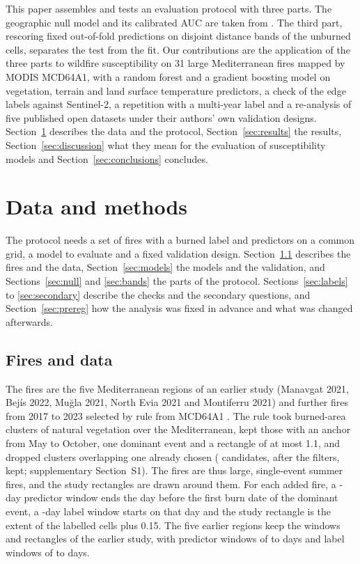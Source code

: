 \documentclass[preprint,12pt,authoryear]{elsarticle}
\begin{document}
This paper assembles and tests an evaluation protocol with three parts. The geographic null model and its calibrated AUC are taken from \citet{Hijmans2012}. The third part, rescoring fixed out-of-fold predictions on disjoint distance bands of the unburned cells, separates the test from the fit. Our contributions are the application of the three parts to wildfire susceptibility on 31 large Mediterranean fires mapped by MODIS MCD64A1, with a random forest and a gradient boosting model on vegetation, terrain and land surface temperature predictors, a check of the edge labels against Sentinel-2, a repetition with a multi-year label and a re-analysis of five published open datasets under their authors' own validation designs. Section~\ref{sec:methods} describes the data and the protocol, Section~\ref{sec:results} the results, Section~\ref{sec:discussion} what they mean for the evaluation of susceptibility models and Section~\ref{sec:conclusions} concludes.

\section{Data and methods}
\label{sec:methods}

The protocol needs a set of fires with a burned label and predictors on a common grid, a model to evaluate and a fixed validation design. Section~\ref{sec:fires} describes the fires and the data, Section~\ref{sec:models} the models and the validation, and Sections~\ref{sec:null} and \ref{sec:bands} the parts of the protocol. Sections~\ref{sec:labels} to \ref{sec:secondary} describe the checks and the secondary questions, and Section~\ref{sec:prereg} how the analysis was fixed in advance and what was changed afterwards.

\subsection{Fires and data}
\label{sec:fires}

The fires are the five Mediterranean regions of an earlier study (Manavgat 2021, Bej\'is 2022, Mu\u{g}la 2021, North Evia 2021 and Montiferru 2021) and \vnAdded{} further fires from 2017 to 2023 selected by rule from MCD64A1 \citep{MCD64A1}. The rule took burned-area clusters of natural vegetation over the Mediterranean, kept those with an anchor from May to October, one dominant event and a rectangle of at most 1.1\textdegree{}, and dropped clusters overlapping one already chosen (\vselCandidates{} candidates, \vselPass{} after the filters, \vselKept{} kept; supplementary Section~S1). The fires are thus large, single-event summer fires, and the study rectangles are drawn around them. For each added fire, a \vpredDays-day predictor window ends the day before the first burn date of the dominant event, a \vlabelDays-day label window starts on that day and the study rectangle is the extent of the labelled cells plus 0.15\textdegree{}. The five earlier regions keep the windows and rectangles of the earlier study, with predictor windows of \vpredDaysEarlyMin{} to \vpredDaysEarlyMax{} days and label windows of \vlabelDaysEarlyMin{} to \vlabelDaysEarlyMax{} days.
\end{document}
